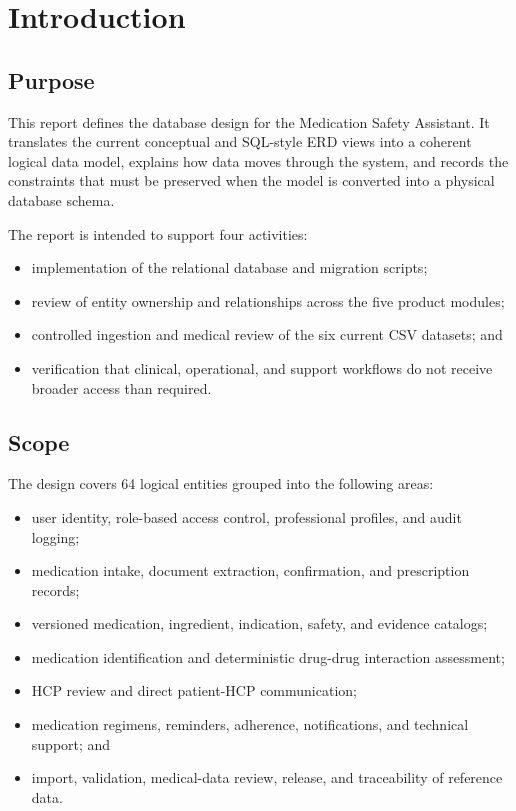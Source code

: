 \section{Introduction}

\subsection{Purpose}

This report defines the database design for the Medication Safety Assistant. It translates the current conceptual and SQL-style ERD views into a coherent logical data model, explains how data moves through the system, and records the constraints that must be preserved when the model is converted into a physical database schema.

The report is intended to support four activities:
\begin{itemize}
  \item implementation of the relational database and migration scripts;
  \item review of entity ownership and relationships across the five product modules;
  \item controlled ingestion and medical review of the six current CSV datasets; and
  \item verification that clinical, operational, and support workflows do not receive broader access than required.
\end{itemize}

\subsection{Scope}

The design covers 64 logical entities grouped into the following areas:
\begin{itemize}
  \item user identity, role-based access control, professional profiles, and audit logging;
  \item medication intake, document extraction, confirmation, and prescription records;
  \item versioned medication, ingredient, indication, safety, and evidence catalogs;
  \item medication identification and deterministic drug-drug interaction assessment;
  \item HCP review and direct patient-HCP communication;
  \item medication regimens, reminders, adherence, notifications, and technical support; and
  \item import, validation, medical-data review, release, and traceability of reference data.
\end{itemize}

